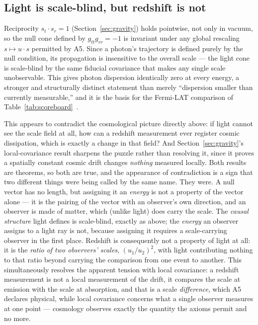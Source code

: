\documentclass[aps,prd,twocolumn,superscriptaddress,nofootinbib]{revtex4-2}
\begin{document}
\subsection{Light is scale-blind, but redshift is not}

Reciprocity $s_t\cdot s_r=1$ (Section~\ref{sec:gravity}) holds pointwise,
not only in vacuum, so the null cone defined by $g_{tt}g_{rr}=-1$ is
invariant under any global rescaling $s\mapsto u\cdot s$ permitted by A5.
Since a photon's trajectory is defined purely by the null condition, its
propagation is insensitive to the overall scale — the light cone is
scale-blind by the same fiducial covariance that makes any single scale
unobservable. This gives photon dispersion identically zero at every
energy, a stronger and structurally distinct statement than merely
``dispersion smaller than currently measurable,'' and it is the basis for
the Fermi-LAT comparison of Table~\ref{tab:scoreboard}~\cite{FermiLAT2009}.

This appears to contradict the cosmological picture directly above: if
light cannot see the scale field at all, how can a redshift measurement
ever register cosmic dissipation, which is exactly a change in that
field? And Section~\ref{sec:gravity}'s local-covariance result sharpens
the puzzle rather than resolving it, since it proves a spatially
constant cosmic drift changes \emph{nothing} measured locally. Both
results are theorems, so both are true, and the appearance of
contradiction is a sign that two different things were being called by
the same name. They were. A null vector has no length, but assigning it
an \emph{energy} is not a property of the vector alone — it is the
pairing of the vector with an observer's own direction, and an observer
is made of matter, which (unlike light) does carry the scale. The
\emph{causal structure} light defines is scale-blind, exactly as above;
the \emph{energy} an observer assigns to a light ray is not, because
assigning it requires a scale-carrying observer in the first place.
Redshift is consequently not a property of light at all: it is the
\emph{ratio of two observers' scales}, $(u_1/u_2)^2$, with light
contributing nothing to that ratio beyond carrying the comparison from
one event to another. This simultaneously resolves the apparent tension
with local covariance: a redshift measurement is not a local measurement
of the drift, it compares the scale at emission with the scale at
absorption, and that is a scale \emph{difference}, which A5 declares
physical, while local covariance concerns what a single observer measures
at one point — cosmology observes exactly the quantity the axioms permit
and no more.
\end{document}
